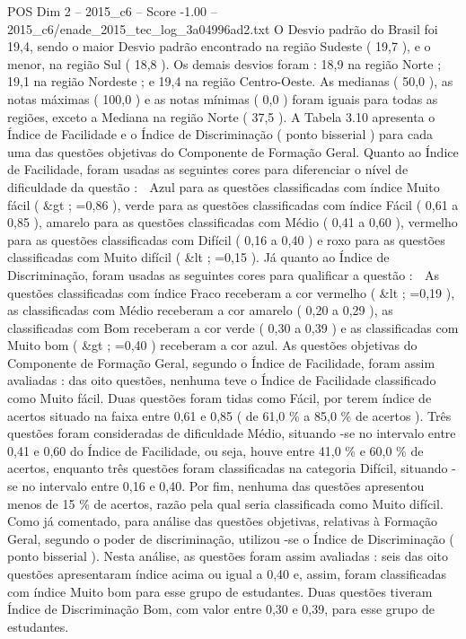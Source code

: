 \begin{textsample}{POS Dim 2 – 2015\_c6 – Score -1.00 – 2015\_c6/enade\_2015\_tec\_log\_3a04996ad2.txt}
O Desvio padrão do Brasil foi 19,4, sendo o maior Desvio padrão encontrado na região Sudeste ( 19,7 ), e o menor, na região Sul ( 18,8 ).
Os demais desvios foram : 18,9 na região Norte ; 19,1 na região Nordeste ; e 19,4 na região Centro-Oeste.
As medianas ( 50,0 ), as notas máximas ( 100,0 ) e as notas mínimas ( 0,0 ) foram iguais para todas as regiões, exceto a Mediana na região Norte ( 37,5 ).
A Tabela 3.10 apresenta o Índice de Facilidade e o Índice de Discriminação ( ponto bisserial ) para cada uma das questões objetivas do Componente de Formação Geral.
Quanto ao Índice de Facilidade, foram usadas as seguintes cores para diferenciar o nível de dificuldade da questão :  Azul para as questões classificadas com índice Muito fácil ( \&gt ; =0,86 ), verde para as questões classificadas com índice Fácil ( 0,61 a 0,85 ), amarelo para as questões classificadas com Médio ( 0,41 a 0,60 ), vermelho para as questões classificadas com Difícil ( 0,16 a 0,40 ) e roxo para as questões classificadas com Muito difícil ( \&lt ; =0,15 ).
Já quanto ao Índice de Discriminação, foram usadas as seguintes cores para qualificar a questão :  As questões classificadas com índice Fraco receberam a cor vermelho ( \&lt ; =0,19 ), as classificadas com Médio receberam a cor amarelo ( 0,20 a 0,29 ), as classificadas com Bom receberam a cor verde ( 0,30 a 0,39 ) e as classificadas com Muito bom ( \&gt ; =0,40 ) receberam a cor azul.
As questões objetivas do Componente de Formação Geral, segundo o Índice de Facilidade, foram assim avaliadas : das oito questões, nenhuma teve o Índice de Facilidade classificado como Muito fácil.
Duas questões foram tidas como Fácil, por terem índice de acertos situado na faixa entre 0,61 e 0,85 ( de 61,0 \% a 85,0 \% de acertos ).
Três questões foram consideradas de dificuldade Médio, situando -se no intervalo entre 0,41 e 0,60 do Índice de Facilidade, ou seja, houve entre 41,0 \% e 60,0 \% de acertos, enquanto três questões foram classificadas na categoria Difícil, situando -se no intervalo entre 0,16 e 0,40.
Por fim, nenhuma das questões apresentou menos de 15 \% de acertos, razão pela qual seria classificada como Muito difícil.
Como já comentado, para análise das questões objetivas, relativas à Formação Geral, segundo o poder de discriminação, utilizou -se o Índice de Discriminação ( ponto bisserial ).
Nesta análise, as questões foram assim avaliadas : seis das oito questões apresentaram índice acima ou igual a 0,40 e, assim, foram classificadas com índice Muito bom para esse grupo de estudantes.
Duas questões tiveram Índice de Discriminação Bom, com valor entre 0,30 e 0,39, para esse grupo de estudantes.

\end{textsample}
